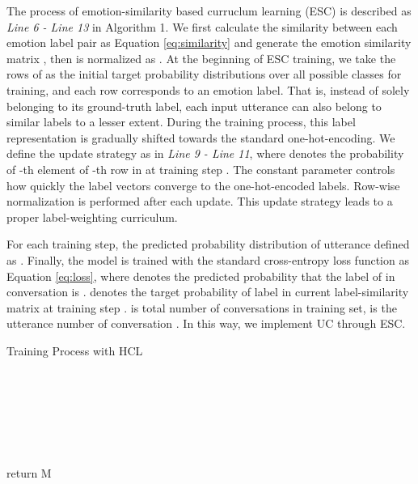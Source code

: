 \documentclass[letterpaper]{article} \usepackage{aaai22}  \usepackage{times}  \usepackage{helvet}  \usepackage{courier}  \usepackage[hyphens]{url}  \usepackage{graphicx} \urlstyle{rm} \def\UrlFont{\rm}  \usepackage{natbib}  \usepackage{caption} \DeclareCaptionStyle{ruled}{labelfont=normalfont,labelsep=colon,strut=off} \frenchspacing  \setlength{\pdfpagewidth}{8.5in}  \setlength{\pdfpageheight}{11in}
\begin{document}
The process of emotion-similarity based curruclum learning (ESC) is described as \emph{Line 6 - Line 13} in Algorithm 1. We first calculate the similarity between each emotion label pair as Equation \ref{eq:similarity} and generate the emotion similarity matrix  , then  is normalized as .  At the beginning of ESC training, we take the rows of  as the initial target probability distributions over all possible classes for training, and each row corresponds to an emotion label. That is, instead of solely belonging to its ground-truth label, each input utterance can also belong to similar labels to a lesser extent. During the training process,  this label representation is gradually shifted towards the standard one-hot-encoding. We define the update strategy as in \emph{Line 9 - Line 11}, where  denotes the probability of -th element of -th row in  at training step . The constant parameter  controls how quickly the label vectors converge to the one-hot-encoded labels. Row-wise normalization is performed after each update. This update strategy leads to a proper label-weighting curriculum.








For each training step,  the predicted probability distribution of utterance   defined as . Finally, the model is trained with the standard cross-entropy loss function as Equation  \ref{eq:loss}, where  denotes the predicted probability that the label of  in conversation  is .  denotes the target probability of label  in current label-similarity matrix at training step .  is total number of conversations in training set,  is the utterance number of conversation . In this way, we implement UC through ESC.



\begin{algorithm2e}[h]
	\caption{Training Process with HCL}  
	\LinesNumbered {}
	\KwOut{ }  
	
	
	
	 \\ 
	 \\
	 \\
	
	
	\For {} {
		 \\
		
		 \\
		
		 \\
		
	}
	return M
\end{algorithm2e}
\end{document}
